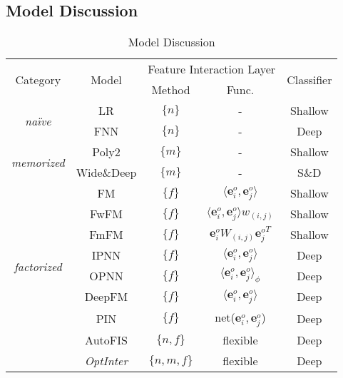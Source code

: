 \documentclass[conference]{IEEEtran}
\begin{document}
\subsection{Model Discussion}
\label{model}

\begin{table}[!htbp]
    \renewcommand\arraystretch{1.00}
    \centering
    \caption{Model Discussion}
    \begin{tabular}{c|c|c|c|c}
    \hline
        \multirow{2}{*}{Category} & \multirow{2}{*}{Model} & \multicolumn{2}{|c|}{Feature Interaction Layer} & \multirow{2}{*}{Classifier} \\
        \cline{3-4}
        & & Method & Func. \\
    \hline
        \multirow{2}{*}{\emph{naïve}} 
        & LR\cite{LR} & $\{n\}$ & - & Shallow \\
        & FNN\cite{FNN} & $\{n\}$ & - & Deep \\
    \hline
        \multirow{2}{*}{\emph{memorized}} 
        & Poly2\cite{Poly-2} & $\{m\}$  & - & Shallow \\
        & Wide\&Deep\cite{Wide_Deep} & $\{m\}$ & - & S\&D \\
    \hline
        \multirow{8}{*}{\emph{factorized}}
        & FM\cite{FM} & $\{f\}$ & $\langle \mathbf{e}^o_i, \mathbf{e}^o_j \rangle$ & Shallow \\
        & FwFM\cite{FwFM} & $\{f\}$ & $\langle \mathbf{e}^o_i, \mathbf{e}^o_j \rangle w_{(i,j)}$ & Shallow \\
        & FmFM\cite{FM2} & $\{f\}$ & $ \mathbf{e}^o_i W_{(i,j)} {\mathbf{e}^o_j}^T $ & Shallow \\
        & IPNN\cite{PNN16} & $\{f\}$ & $\langle \mathbf{e}^o_i, \mathbf{e}^o_j \rangle$ & Deep \\
        & OPNN\cite{PNN16} & $\{f\}$ & $\langle \mathbf{e}^o_i, \mathbf{e}^o_j \rangle_{\phi}$ & Deep \\
        & DeepFM\cite{DeepFM} & $\{f\}$ & $\langle \mathbf{e}^o_i, \mathbf{e}^o_j \rangle$ & Deep \\
        & PIN\cite{PNN19} & $\{f\}$ & net($\mathbf{e}^o_i, \mathbf{e}^o_j$) & Deep \\
\hline
        \multirow{2}{*}{\emph{hybrid}}
        & AutoFIS\cite{AutoFis} & $\{n,f\}$ & flexible & Deep \\
        & \textit{OptInter} & $\{n,m,f\}$ & flexible & Deep \\
    \hline
    \end{tabular}
    \begin{tablenotes}

\end{tablenotes}
\end{table}
\end{document}
